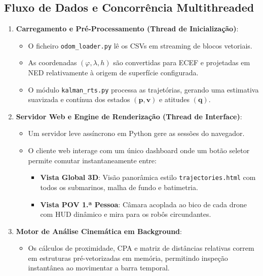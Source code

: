 \documentclass[11pt,a4paper]{article}
\newcommand{\vv}[1]{\mathbf{#1}}
\begin{document}
\subsection{Fluxo de Dados e Concorrência Multithreaded}

\begin{enumerate}
    \item \textbf{Carregamento e Pré-Processamento (Thread de Inicialização)}:
    \begin{itemize}
        \item O ficheiro \texttt{odom\_loader.py} lê os CSVs em streaming de blocos vetoriais.
        \item As coordenadas $(\varphi, \lambda, h)$ são convertidas para ECEF e projetadas em NED relativamente à origem de superfície configurada.
        \item O módulo \texttt{kalman\_rts.py} processa as trajetórias, gerando uma estimativa suavizada e contínua dos estados $(\vv{p}, \vv{v})$ e atitudes $(\vv{q})$.
    \end{itemize}
    \item \textbf{Servidor Web e Engine de Renderização (Thread de Interface)}:
    \begin{itemize}
        \item Um servidor leve assíncrono em Python gere as sessões do navegador.
        \item O cliente web interage com um único dashboard onde um botão seletor permite comutar instantaneamente entre:
        \begin{itemize}
            \item \textbf{Vista Global 3D}: Visão panorâmica estilo \texttt{trajectories.html} com todos os submarinos, malha de fundo e batimetria.
            \item \textbf{Vista POV 1.ª Pessoa}: Câmara acoplada ao bico de cada drone com HUD dinâmico e mira para os robôs circundantes.
        \end{itemize}
    \end{itemize}
    \item \textbf{Motor de Análise Cinemática em Background}:
    \begin{itemize}
        \item Os cálculos de proximidade, CPA e matriz de distâncias relativas correm em estruturas pré-vetorizadas em memória, permitindo inspeção instantânea ao movimentar a barra temporal.
    \end{itemize}
\end{enumerate}
\end{document}
